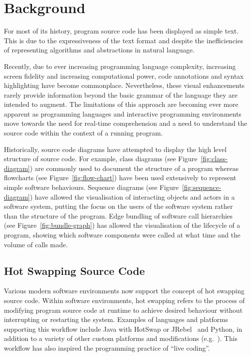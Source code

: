 

\section{Background}

For most of its history, program source code has been displayed as simple text. This is due to the expressiveness of the text format and despite the inefficiencies of representing algorithms and abstractions in natural language.

Recently, due to ever increasing programming language complexity, increasing screen fidelity and increasing computational power, code annotations and syntax highlighting have become commonplace. Nevertheless, these visual enhancements rarely provide information beyond the basic grammar of the language they are intended to augment. The limitations of this approach are becoming ever more apparent as programming languages and interactive programming environments move towards the need for real-time comprehension and a need to understand the source code within the context of a running program.

Historically, source code diagrams have attempted to display the high level structure of source code. For example, class diagrams (see Figure~\ref{fig:class-diagram}) are commonly used to document the structure of a program whereas flowcharts (see Figure~\ref{fig:flow-chart}) have been used extensively to represent simple software behaviours. Sequence diagrams (see Figure~\ref{fig:sequence-diagram}) have allowed the visualisation of interacting objects and actors in a software system, putting the focus on the users of the software system rather than the structure of the program. Edge bundling of software call hierarchies~\cite{Holten2006,Zhou2013} (see Figure~\ref{fig:bundle-graph}) has allowed the visualisation of the lifecycle of a program, showing which software components were called at what time and the volume of calls made.

\subsection{Hot Swapping Source Code}

Various modern software environments now support the concept of hot swapping source code. Within software environments, hot swapping refers to the process of modifying program source code at runtime to achieve desired behaviour without interrupting or restarting the system. Examples of languages and platforms supporting this workflow include Java with HotSwap or JRebel~\cite{ZeroTurnaround2014} and Python, in addition to a variety of other custom platforms and modifications (e.g.~\cite{Thomas2011}). This workflow has also inspired the programming practice of ``live coding''. 

